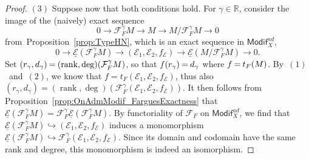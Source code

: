 \documentclass[11pt]{article}
\theoremstyle{definition}
\numberwithin{equation}{section}
\numberwithin{figure}{section}
\numberwithin{table}{section}
\newcommand{\Modif}{\mathsf{Modif}}
\DeclareMathOperator{\rank}{rank}
\newcommand*{\mk}{\mkern -1mu}
\begin{document}
\begin{proof}
$(3)$
Suppose now that both conditions hold. For $\gamma\in\mathbb{R}$, consider the image of the (naively) exact sequence
\[
0\rightarrow\mathcal{F}_{F}^{\gamma}M\rightarrow M\rightarrow M/\mathcal{F}_{F}^{\gamma}M\rightarrow0
\]
from~Proposition~\ref{prop:TypeHN}, which is an exact sequence in $\Modif_{X}^{ad}$,
\[
0\rightarrow\underline{\mathcal{E}}(\mathcal{F}_{F}^{\gamma}M)\rightarrow(\mathcal{E}_{1},\mathcal{E}_{2},f_{\mathcal{E}})\rightarrow\underline{\mathcal{E}}(M/\mathcal{F}_{F}^{\gamma}M)\rightarrow0.
\]
Set $(r_{\gamma},d_{\gamma})\mk=\mk(\rank,\deg)(\mathcal{F}_{F}^{\gamma}M)$, so that $f(r_{\gamma})\mk=\mk d_{\gamma}$ where $f\mk=\mk t_{F}(M)$. By~$(1)$~and~$(2)$, we know that $f=t_{F}(\mathcal{E}_{1},\mathcal{E}_{2},f_{\mathcal{E}})$, thus also $(r_{\gamma},d_{\gamma})=(\rank,\deg)(\mathcal{F}_{F}^{\gamma}(\mathcal{E}_{1},\mathcal{E}_{2},f_{\mathcal{E}}))$. It then follows from Proposition~\ref{prop:OnAdmModif_FarguesExactness} that $\underline{\mathcal{E}}(\mathcal{F}_{F}^{\gamma}M)=\mathcal{F}_{F}^{\gamma}\underline{\mathcal{E}}(\mathcal{F}_{F}^{\gamma}M)$. By functoriality of $\mathcal{F}_{F}$ on $\Modif_{X}^{ad}$, we find that $\underline{\mathcal{E}}(\mathcal{F}_{F}^{\gamma}M)\hookrightarrow(\mathcal{E}_{1},\mathcal{E}_{2},f_{\mathcal{E}})$ induces a monomorphism $\underline{\mathcal{E}}(\mathcal{F}_{F}^{\gamma}M)\hookrightarrow\mathcal{F}_{F}^{\gamma}(\mathcal{E}_{1},\mathcal{E}_{2},f_{\mathcal{E}})$. Since its domain and codomain have the same rank and degree, this monomorphism is indeed an isomorphism.
\end{proof}
\end{document}
